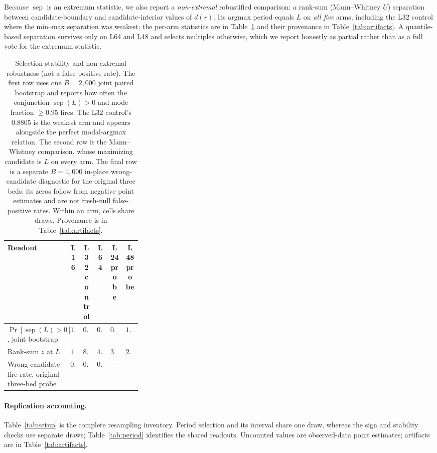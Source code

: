 \documentclass{article}
\begin{document}
Because $\operatorname{sep}$ is an extremum statistic, we also report a
\emph{non-extremal} robustified comparison: a rank-sum (Mann--Whitney $U$)
separation between candidate-boundary and candidate-interior values of $d(r)$.
Its argmax period equals $L$ on \emph{all five} arms, including the L32 control
where the min--max separation was weakest; the per-arm statistics are in
Table~\ref{tab:fpr} and their provenance in Table~\ref{tab:artifacts}. A
quantile-based separation survives only on L64 and L48 and selects multiples
otherwise, which we report honestly as partial rather than as a full vote for
the extremum statistic.

\begin{table}[!b]
\centering
\footnotesize
\setlength{\tabcolsep}{2.7pt}
\begin{tabular}{@{}>{\raggedright\arraybackslash}p{0.31\linewidth}ccccc@{}}
\toprule
Readout & L16 & \shortstack{L32\\control} & L64 & \shortstack{L24\\probe} &
\shortstack{L48\\probe} \\
\midrule
$\Pr[\operatorname{sep}(L)>0]$, joint bootstrap & $1.0$ & $0.8805$ &
$0.9995$ & $0.999$ & $1.0$ \\
Rank-sum $z$ at $L$ & $13.9$ & $8.3$ & $4.4$ & $3.9$ & $2.0$ \\
Wrong-candidate fire rate, original three-bed probe & $0.0$ & $0.0$ & $0.0$ &
--- & --- \\
\bottomrule
\end{tabular}
\caption{Selection stability and non-extremal robustness (not a false-positive
rate). The first row uses one $B{=}2{,}000$ joint paired bootstrap and reports
how often the conjunction $\operatorname{sep}(L)>0$ and mode fraction
$\ge0.95$ fires. The L32 control's $0.8805$ is the weakest arm and appears
alongside the perfect modal-argmax relation. The second row is the
Mann--Whitney comparison, whose maximizing candidate is $L$ on every arm. The
final row is a separate $B{=}1{,}000$ in-place wrong-candidate diagnostic for
the original three beds: its zeros follow from negative point estimates and
are not fresh-null false-positive rates. Within an arm, cells share draws.
Provenance is in Table~\ref{tab:artifacts}.}
\label{tab:fpr}
\end{table}

\paragraph{Replication accounting.}
Table~\ref{tab:setup} is the complete resampling inventory. Period selection and
its interval share one draw, whereas the sign and stability checks use separate
draws; Table~\ref{tab:period} identifies the shared readouts. Uncounted values are
observed-data point estimates; artifacts are in Table~\ref{tab:artifacts}.
\end{document}
